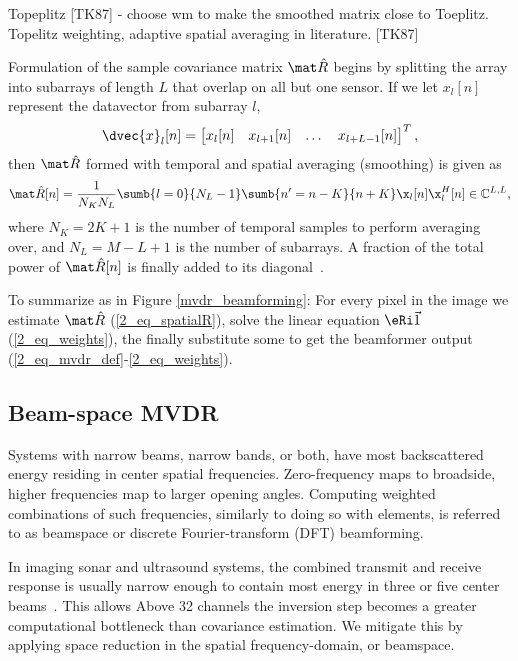 {Topeplitz [TK87] - choose wm to make the smoothed matrix close to Toeplitz. Topelitz weighting, adaptive spatial averaging in literature. [TK87]

Formulation of the sample covariance matrix $\eR$ begins by splitting the array into subarrays of length $L$ that overlap on all but one sensor. If we let $x_l[n]$ represent the datavector from subarray $l$,
%
\begin{gather}
\dvec{x}_l[n] = \bmat{x_l[n] & x_{l+1}[n] & \dots & x_{l+L-1}[n]}^T,
\end{gather}
%
then $\eR$ formed with temporal and spatial averaging (smoothing) is given as
%
\begin{gather}
\eR[n] =  \frac{1}{N_K N_L} \sumb{l=0}{N_L-1}\sumb{n'=n-K}{n+K} \x_l[n]\x_l^H[n] \in\mathbb{C}^{L,L},\label{2_eq_spatialR}
\end{gather}
%
where $N_K = 2K+1$ is the number of temporal samples to perform averaging over, and $N_L = M-L+1$ is the number of subarrays. A fraction of the total power of $\eR[n]$ is finally added to its diagonal~\cite{Synnevag2007}.

To summarize as in Figure \ref{mvdr_beamforming}: For every pixel in the image we estimate $\eR$ (\ref{2_eq_spatialR}), solve the linear equation $\eRi\1$ (\ref{2_eq_weights}), the finally substitute some to get the beamformer output (\ref{2_eq_mvdr_def}-\ref{2_eq_weights}).




\subsection{Beam-space MVDR}

Systems with narrow beams, narrow bands, or both, have most backscattered energy residing in center spatial frequencies. Zero-frequency maps to broadside, higher frequencies map to larger opening angles. Computing weighted combinations of such frequencies, similarly to doing so with elements, is referred to as beamspace or discrete Fourier-transform (DFT) beamforming. 


In imaging sonar and ultrasound systems, the combined transmit and receive response is usually narrow enough to contain most energy in three or five center beams~\cite{Nilsen2009a,VanTrees2002}. This allows  Above 32 channels the inversion step becomes a greater computational bottleneck than covariance estimation. We mitigate this by applying space reduction in the spatial frequency-domain, or beamspace. 

}

